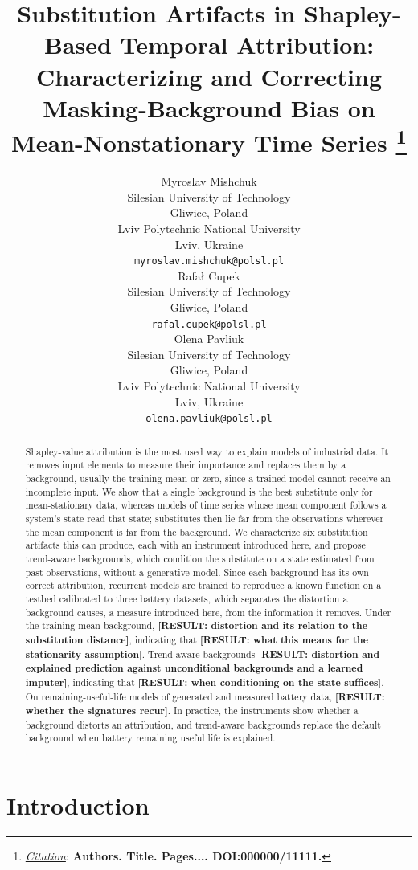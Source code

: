 \documentclass{article}
\title{Substitution Artifacts in Shapley-Based Temporal Attribution:
Characterizing and Correcting Masking-Background Bias on
Mean-Nonstationary Time Series
\thanks{\textit{\underline{Citation}}: 
\textbf{Authors. Title. Pages.... DOI:000000/11111.}} 
}
\author{
  Myroslav Mishchuk \\
  Silesian University of Technology \\ 
  Gliwice, Poland \\
  Lviv Polytechnic National University \\ 
  Lviv, Ukraine \\
  \texttt{myroslav.mishchuk@polsl.pl} \\
   \And
  Rafał Cupek \\
  Silesian University of Technology \\ 
  Gliwice, Poland\\
  \texttt{rafal.cupek@polsl.pl} \\
    \And
  Olena Pavliuk \\
  Silesian University of Technology \\ 
  Gliwice, Poland \\
  Lviv Polytechnic National University \\ 
  Lviv, Ukraine \\
  \texttt{olena.pavliuk@polsl.pl} \\
}
\begin{document}
\maketitle


\begin{abstract}
Shapley-value attribution is the most used way to explain models of industrial data. It removes input elements to measure their importance and replaces them by a background, usually the training mean or zero, since a trained model cannot receive an incomplete input. We show that a single background is the best substitute only for mean-stationary data, whereas models of time series whose mean component follows a system's state read that state; substitutes then lie far from the observations wherever the mean component is far from the background. We characterize six substitution artifacts this can produce, each with an instrument introduced here, and propose trend-aware backgrounds, which condition the substitute on a state estimated from past observations, without a generative model. Since each background has its own correct attribution, recurrent models are trained to reproduce a known function on a testbed calibrated to three battery datasets, which separates the distortion a background causes, a measure introduced here, from the information it removes. Under the training-mean background, \textbf{[RESULT: distortion and its relation to the substitution distance]}, indicating that \textbf{[RESULT: what this means for the stationarity assumption]}. Trend-aware backgrounds \textbf{[RESULT: distortion and explained prediction against unconditional backgrounds and a learned imputer]}, indicating that \textbf{[RESULT: when conditioning on the state suffices]}. On remaining-useful-life models of generated and measured battery data, \textbf{[RESULT: whether the signatures recur]}. In practice, the instruments show whether a background distorts an attribution, and trend-aware backgrounds replace the default background when battery remaining useful life is explained.
\end{abstract}




\section{Introduction}
\label{sec:intro}
\end{document}
